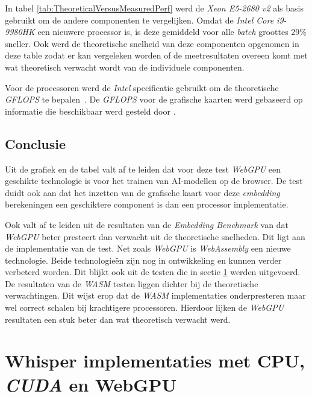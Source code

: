 In tabel \ref{tab:TheoreticalVersusMeasuredPerf} werd de \textit{Xeon E5-2680 v2} als basis gebruikt om de andere componenten te vergelijken. Omdat de \textit{Intel Core i9-9980HK} een nieuwere processor is, is deze gemiddeld voor alle \textit{batch} groottes 29\% sneller. Ook werd de theoretische snelheid van deze componenten opgenomen in deze table zodat er kan vergeleken worden of de meetresultaten overeen komt met wat theoretisch verwacht wordt van de individuele componenten. 

\bigbreak{}

Voor de processoren werd de \textit{Intel} specificatie gebruikt om de theoretische \textit{GFLOPS} te bepalen~\autocite{Intel2024, Intel2024a}. De \textit{GFLOPS} voor de grafische kaarten werd gebaseerd op informatie die beschikbaar werd gesteld door \textcite{TechPowerUp2017, TechPowerUp2017a}.

\subsection{Conclusie}

Uit de grafiek en de tabel valt af te leiden dat voor deze test \textit{WebGPU} een geschikte technologie is voor het trainen van AI-modellen op de browser. De test duidt ook aan dat het inzetten van de grafische kaart voor deze \textit{embedding} berekeningen een geschiktere component is dan een processor implementatie.

\bigbreak{}

Ook valt af te leiden uit de resultaten van de \textit{Embedding Benchmark} van \textcite{Lochner2024} dat \textit{WebGPU} beter presteert dan verwacht uit de theoretische snelheden. Dit ligt aan de implementatie van de test. Net zoals \textit{WebGPU} is \textit{WebAssembly} een nieuwe technologie. Beide technologieën zijn nog in ontwikkeling en kunnen verder verbeterd worden. Dit blijkt ook uit de testen die in sectie \ref{sec:whispertest} werden uitgevoerd. De resultaten van de \textit{WASM} testen liggen dichter bij de theoretische verwachtingen. Dit wijst erop dat de \textit{WASM} implementaties onderpresteren maar wel correct schalen bij krachtigere processoren. Hierdoor lijken de \textit{WebGPU} resultaten een stuk beter dan wat theoretisch verwacht werd.

\break{}

\section{Whisper implementaties met CPU, \textit{CUDA} en WebGPU}%
\label{sec:whispertest}

